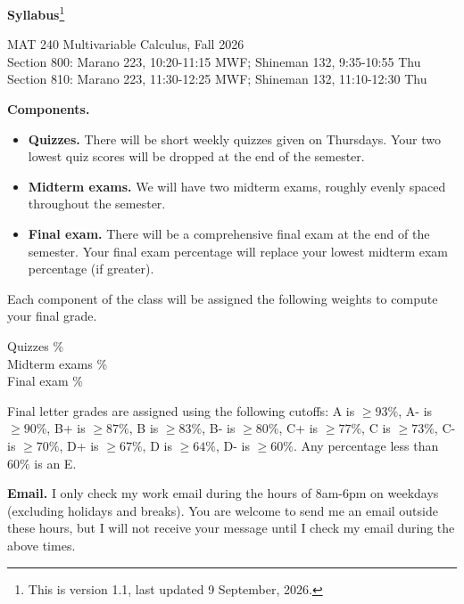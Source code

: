 \documentclass[11pt]{amsart}
\begin{document}
\begin{center}
{\huge \textbf{Syllabus}\footnote{This is version 1.1, last updated 9 September, 2026.}}

{\Large MAT 240 Multivariable Calculus, Fall 2026 \\
\large Section 800: Marano 223, 10:20-11:15 MWF; Shineman 132, 9:35-10:55 Thu\\
\large Section 810: Marano 223, 11:30-12:25 MWF; Shineman 132, 11:10-12:30 Thu\\
}
\end{center}


\textbf{Components.} 

\smallskip
\begin{itemize}
\item \textbf{Quizzes.} There will be short weekly quizzes given on Thursdays. Your two lowest quiz scores will be dropped at the end of the semester. \smallskip
\item \textbf{Midterm exams.} We will have two midterm exams, roughly evenly spaced throughout the semester. \smallskip
\item \textbf{Final exam.} There will be a comprehensive final exam at the end of the semester. Your final exam percentage will replace your lowest midterm exam percentage (if greater).
\end{itemize}
\smallskip

Each component of the class will be assigned the following weights to compute your final grade.

\smallskip
\begin{center}
\begin{minipage}{0.85\linewidth}
Quizzes \% \\
Midterm exams \% \\
Final exam \%
\end{minipage}
\end{center}

\smallskip
Final letter grades are assigned using the following cutoffs: A is $\geq 93\%$, A- is $\geq 90\%$, B+ is $\geq 87\%$, B is $\geq 83\%$, B- is $\geq 80\%$, C+ is $\geq 77\%$, C is $\geq 73\%$, C- is $\geq 70\%$, D+ is $\geq 67\%$, D is $\geq 64\%$, D- is $\geq 60\%$. Any percentage less than $60\%$ is an E.

\smallskip
\textbf{Email.} I only check my work email during the hours of 8am-6pm on weekdays (excluding holidays and breaks). You are welcome to send me an email outside these hours, but I will not receive your message until I check my email during the above times.
\end{document}
